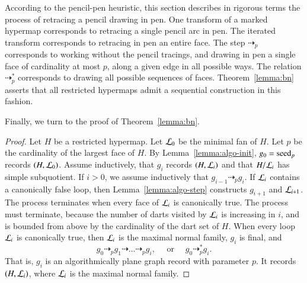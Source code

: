 \begin{remark}
  According to the pencil-pen heuristic, this section describes in
  rigorous terms the process of retracing a pencil drawing in pen.
  One transform of a marked hypermap corresponds to retracing a single pencil
  arc in pen.  The iterated transform corresponds to retracing in pen an
  entire face.  The step $\dashrightarrow_p$ corresponds to working
  without the pencil tracings, and drawing in pen a single face of
  cardinality at most $p$, along a given edge in all possible ways.
  The relation $\dashrightarrow_p^*$ corresponds to drawing all
  possible sequences of faces.  Theorem~\ref{lemma:bn} asserts that
  all restricted hypermaps admit a sequential construction in this
  fashion.
\end{remark}


Finally, we  turn to the proof of Theorem~\ref{lemma:bn}.

\begin{proof}
Let $H$ be a restricted hypermap.  Let ${\cal L}_0$ be the minimal fan of $H$.
Let $p$ be the cardinality of the largest face of $H$.
By Lemma~\ref{lemma:algo-init}, $g_0={\operatorname{seed}}_p$ records $(H,{\cal L}_0)$.
Assume inductively, that $g_i$ records $(H,{\cal L}_i)$ and that $H/{\cal L}_i$
has simple subquotient.  If $i>0$, we assume inductively
that $g_{i-1}\dashrightarrow_p g_i$.  If ${\cal L}_i$ contains a canonically false
loop, then  Lemma~\ref{lemma:algo-step} constructs $g_{i+1}$ and ${\cal L}_{i+1}$.
The process terminates when every face of ${\cal L}_i$ is canonically true.
The process must terminate, because the number of darts visited by ${\cal L}_i$
is increasing in $i$, and is 
 bounded from above by the cardinality of the dart set of $H$.
When every loop ${\cal L}_i$ is canonically true, then ${\cal L}_i$ is the maximal
normal family, $g_i$ is final, and
\[
g_0 \dashrightarrow_p g_1 \dashrightarrow\ldots \dashrightarrow_p g_i,
\quad \text{ or }\quad  g_0 \dashrightarrow_p^* g_i.
\]
That is, $g_i$ is an algorithmically plane graph record with parameter $p$.
It records $(H,{\cal L}_i)$, where ${\cal L}_i$ is the maximal normal family.
\end{proof}